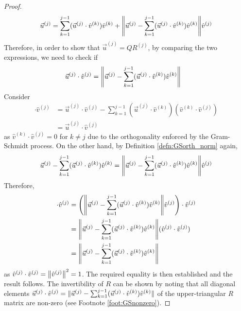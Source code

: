 \begin{proof}
\begin{align*}
\vec{u}^{(j)} = \sum_{k=1}^{j-1}(\vec{u}^{(j)} \cdot \hat{v}^{(k)})\hat{v}^{(k)} + {\norm{\vec{u}^{(j)} - \sum_{k=1}^{j-1}(\vec{u}^{(j)} \cdot \hat{v}^{(k)})\hat{v}^{(k)}}}\hat{v}^{(j)}
\end{align*}
Therefore, in order to show that $\vec{u}^{(j)} = QR^{(j)}$, by comparing the two expressions, we need to check if
\begin{align*}
\vec{u}^{(j)} \cdot \hat{v}^{(j)} &= \norm{\vec{u}^{(j)} - \sum_{k=1}^{j-1}(\vec{u}^{(j)} \cdot \hat{v}^{(k)})\hat{v}^{(k)}}
\end{align*}
Consider
\begin{align*}
[\vec{u}^{(j)} - \sum_{k=1}^{j-1}(\vec{u}^{(j)} \cdot \hat{v}^{(k)})\hat{v}^{(k)}] \cdot \hat{v}^{(j)} &= \vec{u}^{(j)} \cdot \hat{v}^{(j)} - \sum_{k=1}^{j-1}(\vec{u}^{(j)} \cdot \hat{v}^{(k)}) (\hat{v}^{(k)} \cdot \hat{v}^{(j)})\\
&= \vec{u}^{(j)} \cdot \hat{v}^{(j)}
\end{align*}
as $\hat{v}^{(k)} \cdot \hat{v}^{(j)} = 0$ for $k \neq j$ due to the orthogonality enforced by the Gram-Schmidt process. On the other hand, by Definition \ref{defn:GSorth_norm} again, 
\begin{align*}
\vec{u}^{(j)} - \sum_{k=1}^{j-1}(\vec{u}^{(j)} \cdot \hat{v}^{(k)})\hat{v}^{(k)} = \norm{\vec{u}^{(j)} - \sum_{k=1}^{j-1}(\vec{u}^{(j)} \cdot \hat{v}^{(k)})\hat{v}^{(k)}} \hat{v}^{(j)}
\end{align*}
Therefore,
\begin{align*}
[\vec{u}^{(j)} - \sum_{k=1}^{j-1}(\vec{u}^{(j)} \cdot \hat{v}^{(k)})\hat{v}^{(k)}] \cdot \hat{v}^{(j)} &= \left(\norm{\vec{u}^{(j)} - \sum_{k=1}^{j-1}(\vec{u}^{(j)} \cdot \hat{v}^{(k)})\hat{v}^{(k)}} \hat{v}^{(j)}\right) \cdot \hat{v}^{(j)} \\
&= \norm{\vec{u}^{(j)} - \sum_{k=1}^{j-1}(\vec{u}^{(j)} \cdot \hat{v}^{(k)})\hat{v}^{(k)}} (\hat{v}^{(j)} \cdot\hat{v}^{(j)}) \\
&= \norm{\vec{u}^{(j)} - \sum_{k=1}^{j-1}(\vec{u}^{(j)} \cdot \hat{v}^{(k)})\hat{v}^{(k)}}
\end{align*}
as $\hat{v}^{(j)} \cdot \hat{v}^{(j)} = \norm{\hat{v}^{(j)}}^2 = 1$. The required equality is then established and the result follows. The invertibility of $R$ can be shown by noting that all diagonal elements $\vec{u}^{(j)} \cdot \hat{v}^{(j)} = \norm{\smash{\vec{u}^{(j)} - \sum_{k=1}^{j-1}(\vec{u}^{(j)} \cdot \hat{v}^{(k)})\hat{v}^{(k)}}} $ of the upper-triangular $R$ matrix are non-zero (see Footnote \ref{foot:GSnonzero}). 
\end{proof}

